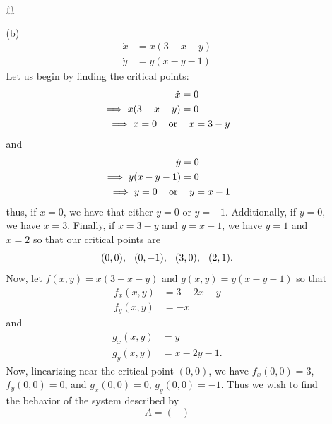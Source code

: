 \documentclass{article}
\begin{document}
\begin{itemize}
\begin{itemize}
\begin{center}
        \end{center}
        \hfill $\mathghost$
    

        
        \item[(b)] 
        \begin{align*}
            \dot{x} &= x(3 - x - y)\\
            \dot{y} &= y(x - y - 1)
        \end{align*}
        Let us begin by finding the critical points:
        \begin{align*}
            \dot{x} &= 0\\
            \implies x(3 - x - y) &= 0\\
            \implies x = 0 \hspace{0.3cm} \text{ or }& \hspace{0.3 cm} x = 3 - y
        \end{align*}
        and
        \begin{align*}
            \dot{y} &= 0\\
            \implies y(x - y - 1) &= 0\\
            \implies y = 0 \hspace{0.3cm} \text{ or }& \hspace{0.3cm} y = x - 1
        \end{align*}
        thus, if $x = 0$, we have that either $y = 0$ or $y = -1$. Additionally, if $y = 0$, we have $x = 3$. Finally, if $x = 3 - y$ and $y = x - 1$, we have $y = 1$ and $x = 2$ so that our critical points are
        \[(0,0), \hspace{0.25cm} (0,-1), \hspace{0.25cm} (3,0), \hspace{0.25cm} (2,1).\]
        Now, let $f(x,y) = x(3 - x - y)$ and $g(x,y) = y(x - y - 1)$ so that 
        \begin{align*}
            f_x(x,y) &= 3 - 2x - y\\
            f_y(x,y) &= -x
        \end{align*}
        and
        \begin{align*}
            g_x(x,y) &= y\\
            g_y(x,y) &= x - 2y - 1.
        \end{align*}
        Now, linearizing near the critical point $(0,0)$, we have $f_x(0,0) = 3$, $f_y(0,0) = 0$, and $g_x(0,0) = 0$, $g_y(0,0) = -1$. Thus we wish to find the behavior of the system described by
        \[A = \begin{pmatrix}

\end{pmatrix}\]
\end{itemize}
\end{itemize}
\end{document}
